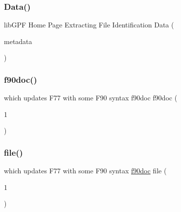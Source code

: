 \subsubsection{\texorpdfstring{Data()}{Data()}}
{\footnotesize\ttfamily lib\+G\+PF Home Page Extracting File Identification Data (\begin{DoxyParamCaption}\item[{metadata}]{ }\end{DoxyParamCaption})}

\mbox{\label{what__overview_81_8txt_aab2f56fdcdfab484c0d861985675a92f}} 
\subsubsection{\texorpdfstring{f90doc()}{f90doc()}}
{\footnotesize\ttfamily which updates F77 with some F90 syntax f90doc f90doc (\begin{DoxyParamCaption}\item[{1}]{ }\end{DoxyParamCaption})}

\mbox{\label{what__overview_81_8txt_a447b56c526e8da30e0dc94673727ee25}} 
\subsubsection{\texorpdfstring{file()}{file()}}
{\footnotesize\ttfamily which updates F77 with some F90 syntax \hyperlink{what__overview_81_8txt_aab2f56fdcdfab484c0d861985675a92f}{f90doc} file (\begin{DoxyParamCaption}\item[{1}]{ }\end{DoxyParamCaption})}

\mbox{\label{what__overview_81_8txt_ab6ccd3cf736f24d661599d9ce944e9bf}} 
